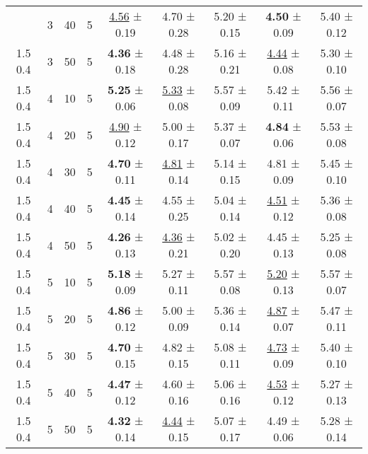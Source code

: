 \begin{tabular}{ccccccccc}
\begin{tabular}{lllllllll}
1.5 0.4 & 3 & 40 & 5 & \underline{4.56} ± 0.19 &             4.70 ± 0.28 & 5.20 ± 0.15 &    \textbf{4.50} ± 0.09 & 5.40 ± 0.12 \\
1.5 0.4 & 3 & 50 & 5 &    \textbf{4.36} ± 0.18 &             4.48 ± 0.28 & 5.16 ± 0.21 & \underline{4.44} ± 0.08 & 5.30 ± 0.10 \\
1.5 0.4 & 4 & 10 & 5 &    \textbf{5.25} ± 0.06 & \underline{5.33} ± 0.08 & 5.57 ± 0.09 &             5.42 ± 0.11 & 5.56 ± 0.07 \\
1.5 0.4 & 4 & 20 & 5 & \underline{4.90} ± 0.12 &             5.00 ± 0.17 & 5.37 ± 0.07 &    \textbf{4.84} ± 0.06 & 5.53 ± 0.08 \\
1.5 0.4 & 4 & 30 & 5 &    \textbf{4.70} ± 0.11 & \underline{4.81} ± 0.14 & 5.14 ± 0.15 &             4.81 ± 0.09 & 5.45 ± 0.10 \\
1.5 0.4 & 4 & 40 & 5 &    \textbf{4.45} ± 0.14 &             4.55 ± 0.25 & 5.04 ± 0.14 & \underline{4.51} ± 0.12 & 5.36 ± 0.08 \\
1.5 0.4 & 4 & 50 & 5 &    \textbf{4.26} ± 0.13 & \underline{4.36} ± 0.21 & 5.02 ± 0.20 &             4.45 ± 0.13 & 5.25 ± 0.08 \\
1.5 0.4 & 5 & 10 & 5 &    \textbf{5.18} ± 0.09 &             5.27 ± 0.11 & 5.57 ± 0.08 & \underline{5.20} ± 0.13 & 5.57 ± 0.07 \\
1.5 0.4 & 5 & 20 & 5 &    \textbf{4.86} ± 0.12 &             5.00 ± 0.09 & 5.36 ± 0.14 & \underline{4.87} ± 0.07 & 5.47 ± 0.11 \\
1.5 0.4 & 5 & 30 & 5 &    \textbf{4.70} ± 0.15 &             4.82 ± 0.15 & 5.08 ± 0.11 & \underline{4.73} ± 0.09 & 5.40 ± 0.10 \\
1.5 0.4 & 5 & 40 & 5 &    \textbf{4.47} ± 0.12 &             4.60 ± 0.16 & 5.06 ± 0.16 & \underline{4.53} ± 0.12 & 5.27 ± 0.13 \\
1.5 0.4 & 5 & 50 & 5 &    \textbf{4.32} ± 0.14 & \underline{4.44} ± 0.15 & 5.07 ± 0.17 &             4.49 ± 0.06 & 5.28 ± 0.14 \\
\bottomrule
\end{tabular}
